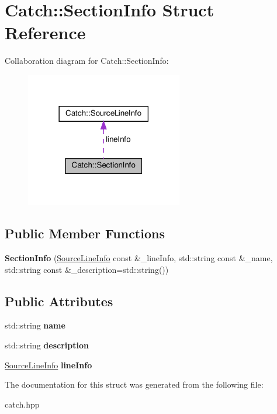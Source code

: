 \hypertarget{structCatch_1_1SectionInfo}{}\section{Catch\+:\+:Section\+Info Struct Reference}
\label{structCatch_1_1SectionInfo}


Collaboration diagram for Catch\+:\+:Section\+Info\+:\nopagebreak
\begin{figure}[H]
\begin{center}
\leavevmode
\includegraphics[width=194pt]{structCatch_1_1SectionInfo__coll__graph}
\end{center}
\end{figure}
\subsection*{Public Member Functions}
\begin{DoxyCompactItemize}
\item 
\mbox{\label{structCatch_1_1SectionInfo_a27aff3aaf8b6611f3651b17111a272c6}} 
{\bfseries Section\+Info} (\hyperlink{structCatch_1_1SourceLineInfo}{Source\+Line\+Info} const \&\+\_\+line\+Info, std\+::string const \&\+\_\+name, std\+::string const \&\+\_\+description=std\+::string())
\end{DoxyCompactItemize}
\subsection*{Public Attributes}
\begin{DoxyCompactItemize}
\item 
\mbox{\label{structCatch_1_1SectionInfo_a704c8fc662d309137e0d4f199cb7df58}} 
std\+::string {\bfseries name}
\item 
\mbox{\label{structCatch_1_1SectionInfo_a0052060219a6de74bb7ade34d4163a4e}} 
std\+::string {\bfseries description}
\item 
\mbox{\label{structCatch_1_1SectionInfo_adbc83b8a3507c4acc8ee249e93465711}} 
\hyperlink{structCatch_1_1SourceLineInfo}{Source\+Line\+Info} {\bfseries line\+Info}
\end{DoxyCompactItemize}


The documentation for this struct was generated from the following file\+:\begin{DoxyCompactItemize}
\item 
catch.\+hpp\end{DoxyCompactItemize}
